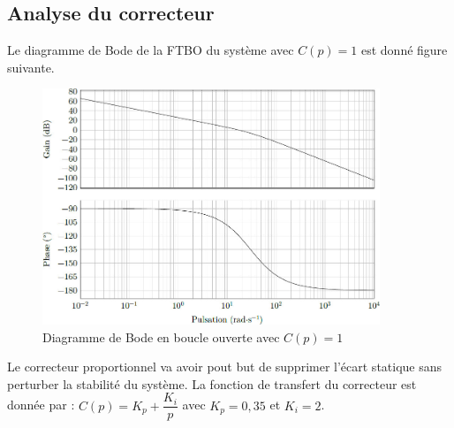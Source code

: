 \subsection{Analyse du correcteur}
Le diagramme de Bode de la FTBO du système avec $C(p)=1$ est donné figure suivante. 

\begin{figure}[!htb]
\begin{center}
\includegraphics[width=0.9\textwidth]{images/image_fig18.jpg}
\caption{Diagramme de Bode en boucle ouverte avec $C(p)=1$ \label{fig18}}
\end{center}
\end{figure}

\ifprof
\begin{corrige}
\end{corrige}
\else
\fi

Le correcteur proportionnel va avoir pout but de supprimer l'écart statique sans perturber la stabilité du système.
La fonction de transfert du correcteur est donnée par : $C(p)=K_p + \dfrac{K_i}{p}$ avec $K_p = 0,35$ et $K_i = 2$.

\ifprof
\begin{corrige}
\end{corrige}
\else
\fi

